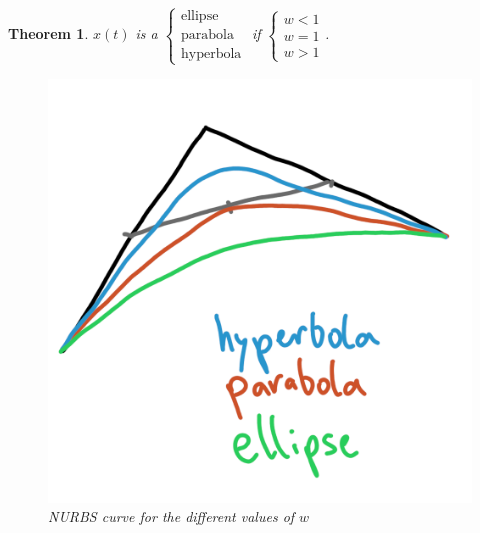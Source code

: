 \documentclass[]{article}
\newtheorem{theorem}{Theorem}
\begin{document}
\begin{theorem}
	$x(t)$ is a $\begin{cases}
		\text{ellipse}\\
		\text{parabola}\\
		\text{hyperbola}
	\end{cases}$ if $\begin{cases}w<1\\ w=1\\ w>1\end{cases}$.
	
	\begin{figure}[h!]
		\centering
		\includegraphics[width=0.3\linewidth]{figures/nurbs_par_hyp_ellip}
		\caption{NURBS curve for the different values of $w$}
		\label{fig:nurbs_par_hyp_ellip}
	\end{figure}
\end{theorem}
\end{document}
